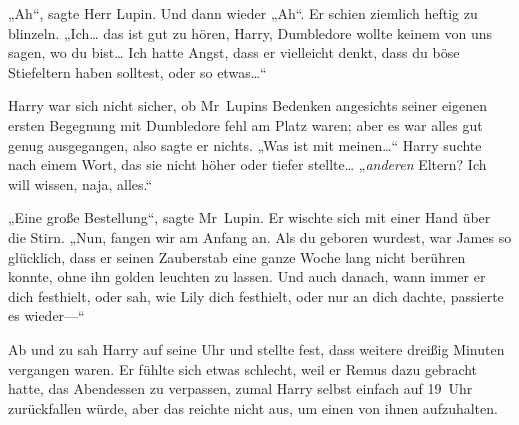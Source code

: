 „Ah“, sagte Herr Lupin. Und dann wieder „Ah“. Er schien ziemlich heftig zu blinzeln. „Ich… das ist gut zu hören, Harry, Dumbledore wollte keinem von uns sagen, wo du bist… Ich hatte Angst, dass er vielleicht denkt, dass du böse Stiefeltern haben solltest, oder so etwas…“

Harry war sich nicht sicher, ob Mr~Lupins Bedenken angesichts seiner eigenen ersten Begegnung mit Dumbledore fehl am Platz waren; aber es war alles gut genug ausgegangen, also sagte er nichts. „Was ist mit meinen…“ Harry suchte nach einem Wort, das sie nicht höher oder tiefer stellte… „\emph{anderen} Eltern? Ich will wissen, naja, alles.“

„Eine große Bestellung“, sagte Mr~Lupin. Er wischte sich mit einer Hand über die Stirn. „Nun, fangen wir am Anfang an. Als du geboren wurdest, war James so glücklich, dass er seinen Zauberstab eine ganze Woche lang nicht berühren konnte, ohne ihn golden leuchten zu lassen. Und auch danach, wann immer er dich festhielt, oder sah, wie Lily dich festhielt, oder nur an dich dachte, passierte es wieder—“

\later

Ab und zu sah Harry auf seine Uhr und stellte fest, dass weitere dreißig Minuten vergangen waren. Er fühlte sich etwas schlecht, weil er Remus dazu gebracht hatte, das Abendessen zu verpassen, zumal Harry selbst einfach auf 19~Uhr zurückfallen würde, aber das reichte nicht aus, um einen von ihnen aufzuhalten.

